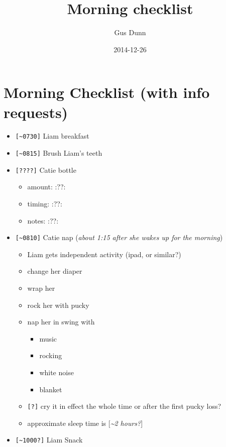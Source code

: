 \documentclass[letterpaper]{scrartcl}
\title{Morning checklist}
\author{Gus Dunn}
\date{2014-12-26}
\begin{document}
\maketitle

\section{Morning Checklist (with info
requests)}\label{morning-checklist-with-info-requests}

\begin{itemize}
\item
  \texttt{{[}\textasciitilde{}0730{]}} Liam breakfast
\item
  \texttt{{[}\textasciitilde{}0815{]}} Brush Liam's teeth
\item
  \texttt{{[}????{]}} Catie bottle

  \begin{itemize}
  \itemsep1pt\parskip0pt
  \item
    amount: :??:
  \item
    timing: :??:
  \item
    notes: :??:
  \end{itemize}
\item
  \texttt{{[}\textasciitilde{}0810{]}} Catie nap (\emph{about 1:15 after
  she wakes up for the morning})

  \begin{itemize}
  \itemsep1pt\parskip0pt
  \item
    Liam gets independent activity (ipad, or similar?)
  \item
    change her diaper
  \item
    wrap her
  \item
    rock her with pucky
  \item
    nap her in swing with

    \begin{itemize}
    \itemsep1pt\parskip0pt
    \item
      music
    \item
      rocking
    \item
      white noise
    \item
      blanket
    \end{itemize}
  \item
    \texttt{{[}?{]}} cry it in effect the whole time or after the first
    pucky loss?
  \item
    approximate sleep time is {[}\emph{\textasciitilde{}2 hours?}{]}
  \end{itemize}
\item
  \texttt{{[}\textasciitilde{}1000?{]}} Liam Snack


\end{itemize}
\end{document}
